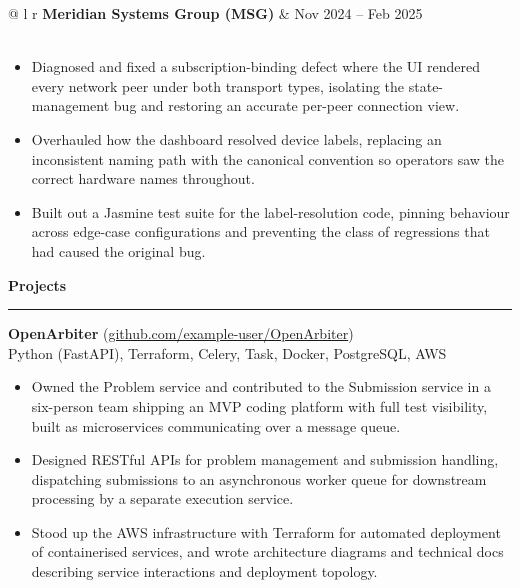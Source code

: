 \documentclass[a4paper,10pt]{article}
\newcommand{\resheading}[1]{%
  \vspace{0.8ex}%
  \noindent\textbf{\large #1}\\[-2.0ex]
  \rule{\textwidth}{0.4pt}\vspace{0ex}
}
\begin{document}
\noindent
\begin{tabular*}{\textwidth}{@{\extracolsep{\fill}} l r}
\textbf{Meridian Systems Group (MSG)} & Nov 2024 -- Feb 2025 \\
 \\
\end{tabular*}
\vspace{-1.5ex}
\begin{itemize}
    \item Diagnosed and fixed a subscription-binding defect where the UI rendered every network peer under both transport types, isolating the state-management bug and restoring an accurate per-peer connection view.
    \item Overhauled how the dashboard resolved device labels, replacing an inconsistent naming path with the canonical convention so operators saw the correct hardware names throughout.
    \item Built out a Jasmine test suite for the label-resolution code, pinning behaviour across edge-case configurations and preventing the class of regressions that had caused the original bug.
\end{itemize}

\vspace{-0.4ex}
\resheading{Projects}
\noindent
\textbf{OpenArbiter} (\href{https://github.com/example-user/OpenArbiter}{github.com/example-user/OpenArbiter})\\
Python (FastAPI), Terraform, Celery, Task, Docker, PostgreSQL, AWS
\begin{itemize}
    \item Owned the Problem service and contributed to the Submission service in a six-person team shipping an MVP coding platform with full test visibility, built as microservices communicating over a message queue.
    \item Designed RESTful APIs for problem management and submission handling, dispatching submissions to an asynchronous worker queue for downstream processing by a separate execution service.
    \item Stood up the AWS infrastructure with Terraform for automated deployment of containerised services, and wrote architecture diagrams and technical docs describing service interactions and deployment topology.
\end{itemize}
\end{document}
